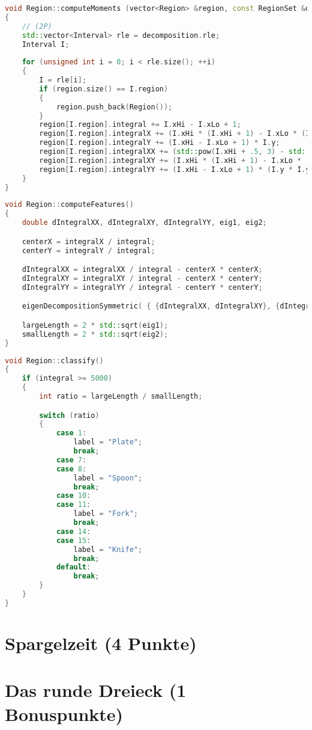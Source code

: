 \documentclass{ezb}
\begin{document}
\begin{lstlisting}[language=C++, caption=Auxiliary routine for group regions]
void Region::computeMoments (vector<Region> &region, const RegionSet &decomposition)
{
	// (2P)
	std::vector<Interval> rle = decomposition.rle;
	Interval I;
	
	for (unsigned int i = 0; i < rle.size(); ++i)
	{
		I = rle[i];
		if (region.size() == I.region)
		{
			region.push_back(Region());
		}
		region[I.region].integral += I.xHi - I.xLo + 1;
		region[I.region].integralX += (I.xHi * (I.xHi + 1) - I.xLo * (I.xLo - 1)) * .5;
		region[I.region].integralY += (I.xHi - I.xLo + 1) * I.y;
		region[I.region].integralXX += (std::pow(I.xHi + .5, 3) - std::pow(I.xLo - .5, 3)) / 3.0;
		region[I.region].integralXY += (I.xHi * (I.xHi + 1) - I.xLo * (I.xLo - 1)) * I.y * .5;
		region[I.region].integralYY += (I.xHi - I.xLo + 1) * (I.y * I.y + 1.0 / 12.0);
	}
}
\end{lstlisting}
\newpage
\begin{lstlisting}[language=C++, caption=Compute center and inertial axes from the second order moments]
void Region::computeFeatures()
{
	double dIntegralXX, dIntegralXY, dIntegralYY, eig1, eig2;

	centerX = integralX / integral;
	centerY = integralY / integral;

	dIntegralXX = integralXX / integral - centerX * centerX;
	dIntegralXY = integralXY / integral - centerX * centerY;
	dIntegralYY = integralYY / integral - centerY * centerY;

	eigenDecompositionSymmetric( { {dIntegralXX, dIntegralXY}, {dIntegralXY, dIntegralYY} }, mainAxis, eig1, eig2);

	largeLength = 2 * std::sqrt(eig1);
	smallLength = 2 * std::sqrt(eig2);
}
\end{lstlisting}

\begin{lstlisting}[language=C++, caption=Determine label from area and inertial axes]
void Region::classify()
{
	if (integral >= 5000)
	{
		int ratio = largeLength / smallLength;

		switch (ratio)
		{
			case 1:
				label = "Plate";
				break;
			case 7:
			case 8:
				label = "Spoon";
				break;
			case 10:
			case 11:
				label = "Fork";
				break;
			case 14:
			case 15:
				label = "Knife";
				break;
			default:
				break;
		}
	}
}
\end{lstlisting}

\newpage
\section{Spargelzeit (4 Punkte)}

\newpage
\section{Das runde Dreieck (1 Bonuspunkte)}


\end{document}
